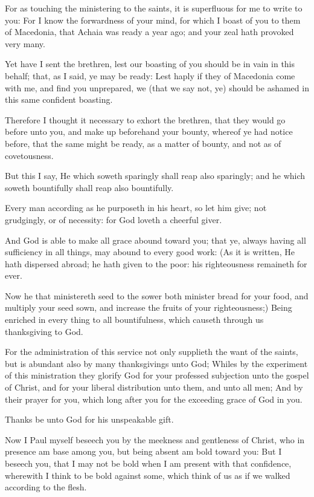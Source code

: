 \Chapter
\Verse For as touching the ministering to the saints, it is superfluous for me to write to you: \Verse For I know the forwardness of your mind, for which I boast of you to them of Macedonia, that Achaia was ready a year ago; and your zeal hath provoked very many.

\Verse Yet have I sent the brethren, lest our boasting of you should be in vain in this behalf; that, as I said, ye may be ready: \Verse Lest haply if they of Macedonia come with me, and find you unprepared, we (that we say not, ye) should be ashamed in this same confident boasting.

\Verse Therefore I thought it necessary to exhort the brethren, that they would go before unto you, and make up beforehand your bounty, whereof ye had notice before, that the same might be ready, as a matter of bounty, and not as of covetousness.

\Verse But this I say, He which soweth sparingly shall reap also sparingly; and he which soweth bountifully shall reap also bountifully.

\Verse Every man according as he purposeth in his heart, so let him give; not grudgingly, or of necessity: for God loveth a cheerful giver.

\Verse And God is able to make all grace abound toward you; that ye, always having all sufficiency in all things, may abound to every good work: \Verse (As it is written, He hath dispersed abroad; he hath given to the poor: his righteousness remaineth for ever.

\Verse Now he that ministereth seed to the sower both minister bread for your food, and multiply your seed sown, and increase the fruits of your righteousness;) \Verse Being enriched in every thing to all bountifulness, which causeth through us thanksgiving to God.

\Verse For the administration of this service not only supplieth the want of the saints, but is abundant also by many thanksgivings unto God; \Verse Whiles by the experiment of this ministration they glorify God for your professed subjection unto the gospel of Christ, and for your liberal distribution unto them, and unto all men; \Verse And by their prayer for you, which long after you for the exceeding grace of God in you.

\Verse Thanks be unto God for his unspeakable gift.


\Chapter
\Verse Now I Paul myself beseech you by the meekness and gentleness of Christ, who in presence am base among you, but being absent am bold toward you: \Verse But I beseech you, that I may not be bold when I am present with that confidence, wherewith I think to be bold against some, which think of us as if we walked according to the flesh.

